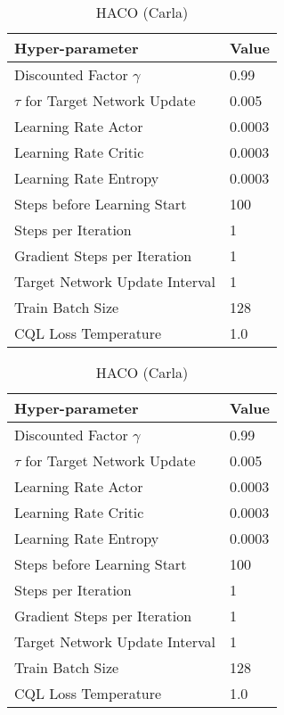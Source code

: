 \begin{table}[H]
\begin{small}
\begin{minipage}{0.45\linewidth}
\centering
\caption{HACO (MetaDrive)}
\begin{tabular}{@{}ll@{}}
\toprule
Hyper-parameter             & Value  \\ \midrule
Discounted Factor $\gamma$   & 0.99  \\
$\tau$ for Target Network Update & 0.005 \\
Learning Rate Actor             & 0.0003 \\ 
Learning Rate Critic            & 0.0003 \\ 
Learning Rate Entropy           & 0.0003 \\ 
Steps before Learning Start & 100\\
Steps per Iteration & 1\\
Gradient Steps per Iteration & 1\\
Target Network Update Interval & 1\\
Train Batch Size & 128  \\
CQL Loss Temperature & 1.0 \\
\bottomrule
\end{tabular}
\end{minipage}\hfill
\begin{minipage}{0.45\linewidth}
\centering
\caption{HACO (Carla)}
\begin{tabular}{@{}ll@{}}
\toprule
Hyper-parameter             & Value  \\ \midrule
Discounted Factor $\gamma$   & 0.99  \\
$\tau$ for Target Network Update & 0.005 \\
Learning Rate Actor             & 0.0003 \\ 
Learning Rate Critic            & 0.0003 \\ 
Learning Rate Entropy           & 0.0003 \\ 
Steps before Learning Start & 100\\
Steps per Iteration & 1\\
Gradient Steps per Iteration & 1\\
Target Network Update Interval & 1\\
Train Batch Size & 128  \\
CQL Loss Temperature & 1.0 \\
\bottomrule
\end{tabular}
\end{minipage}
\end{small}
\end{table}


